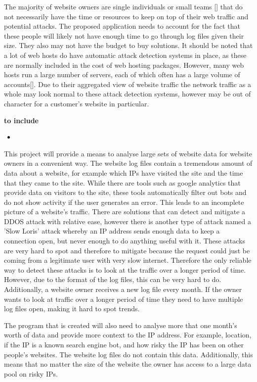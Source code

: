 The majority of website owners are single individuals or small teams [] that do not necessarily have the time or resources to keep on top of their web traffic and potential attacks. The proposed application needs to account for the fact that these people will likely not have enough time to go through log files given their size. They also may not have the budget to buy solutions. It should be noted that a lot of web hosts do have automatic attack detection systems in place, as these are normally included in the cost of web hosting packages. However, many web hosts run a large number of servers, each of which often has a large volume of accounts[]. Due to their aggregated view of website traffic the network traffic as a whole may look normal to these attack detection systems, however may be out of character for a customer's website in particular.

\textbf{to include}
\begin{itemize}
    \item 
\end{itemize}

This project will provide a means to analyse large sets of website data for website owners in a convenient way. The website log files contain a tremendous amount of data about a website, for example which IPs have visited the site and the time that they came to the site. While there are tools such as google analytics that provide data on visitors to the site, these tools automatically filter out bots and do not show activity if the user generates an error. This leads to an incomplete picture of a website's traffic. There are solutions that can detect and mitigate a DDOS attack with relative ease, however there is another type of attack named a 'Slow Loris' attack whereby an IP address sends enough data to keep a connection open, but never enough to do anything useful with it. These attacks are very hard to spot and therefore to mitigate because the request could just be coming from a legitimate user with very slow internet. Therefore the only reliable way to detect these attacks is to look at the traffic over a longer period of time. However, due to the format of the log files, this can be very hard to do. Additionally, a website owner receives a new log file every month. If the owner wants to look at traffic over a longer period of time they need to have multiple log files open, making it hard to spot trends.

The program that is created will also need to analyse more that one month's worth of data and provide more context to the IP address. For example, location, if the IP is a known search engine bot, and how risky the IP has been on other people's websites. The website log files do not contain this data. Additionally, this means that no matter the size of the website the owner has access to a large data pool on risky IPs. 

